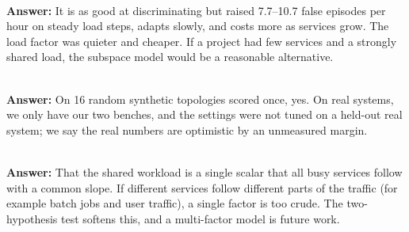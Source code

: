 \\
\textbf{Answer:} It is as good at discriminating but raised 7.7--10.7 false episodes per hour on steady load steps, adapts slowly, and costs more as services grow. The load factor was quieter and cheaper. If a project had few services and a strongly shared load, the subspace model would be a reasonable alternative.

\\
\textbf{Answer:} On 16 random synthetic topologies scored once, yes. On real systems, we only have our two benches, and the settings were not tuned on a held-out real system; we say the real numbers are optimistic by an unmeasured margin.

\\
\textbf{Answer:} That the shared workload is a single scalar that all busy services follow with a common slope. If different services follow different parts of the traffic (for example batch jobs and user traffic), a single factor is too crude. The two-hypothesis test softens this, and a multi-factor model is future work.

